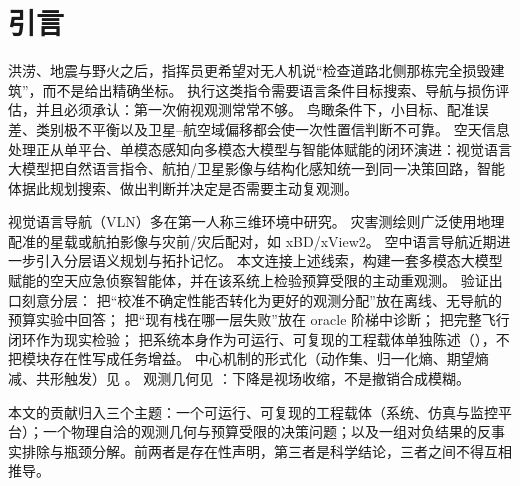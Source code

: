 \section{引言}
\label{sec:introduction}

洪涝、地震与野火之后，指挥员更希望对无人机说``检查道路北侧那栋完全损毁建筑''，而不是给出精确坐标。
执行这类指令需要语言条件目标搜索、导航与损伤评估，并且必须承认：第一次俯视观测常常不够。
鸟瞰条件下，小目标、配准误差、类别极不平衡以及卫星--航空域偏移都会使一次性置信判断不可靠。
空天信息处理正从单平台、单模态感知向多模态大模型与智能体赋能的闭环演进：视觉语言大模型把自然语言指令、航拍/卫星影像与结构化感知统一到同一决策回路，智能体据此规划搜索、做出判断并决定是否需要主动复观测。

视觉语言导航（VLN）多在第一人称三维环境中研究\cite{anderson2018vision,liu2023aerialvln}。
灾害测绘则广泛使用地理配准的星载或航拍影像与灾前/灾后配对，如 xBD/xView2\cite{gupta2019xbd}。
空中语言导航近期进一步引入分层语义规划与拓扑记忆\cite{zhang2025citynavagent,gao2024stmr,shah2023lmnav}。
本文连接上述线索，构建一套多模态大模型赋能的空天应急侦察智能体，并在该系统上检验预算受限的主动重观测。
验证出口刻意分层：
把``校准不确定性能否转化为更好的观测分配''放在离线、无导航的预算实验中回答；
把``现有栈在哪一层失败''放在 oracle 阶梯中诊断；
把完整飞行闭环作为现实检验；
把系统本身作为可运行、可复现的工程载体单独陈述（），不把模块存在性写成任务增益。
中心机制的形式化（动作集、归一化熵、期望熵减、共形触发）见 。
观测几何见 ：下降是视场收缩，不是撤销合成模糊。


本文的贡献归入三个主题：一个可运行、可复现的工程载体（系统、仿真与监控平台）；一个物理自洽的观测几何与预算受限的决策问题；以及一组对负结果的反事实排除与瓶颈分解。前两者是存在性声明，第三者是科学结论，三者之间不得互相推导。

